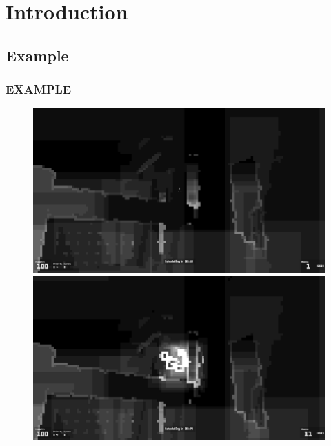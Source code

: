 \section{Introduction}

\subsection{Example}
\begin{frame}
\frametitle{EXAMPLE}

\begin{figure}[ht]
  \begin{minipage}[b]{0.3\linewidth}
    \centering
    \includegraphics[width=1.0\textwidth]{img/tbds1.png}
  \end{minipage}
  \hspace{0.25cm}
  \begin{minipage}[b]{0.3\linewidth}
    \centering
    \includegraphics[width=1.0\textwidth]{img/tbds2.png}
  \end{minipage}
  \hspace{0.25cm}

\end{figure}
\end{frame}
